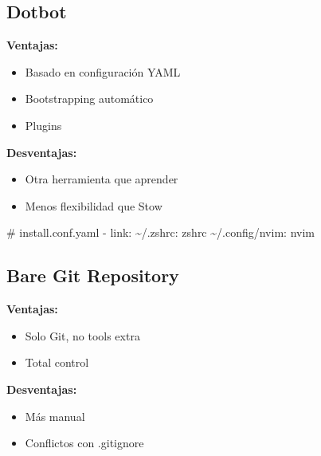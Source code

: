 \documentclass[
  doc,
  floatsintext,
  longtable,
  a4paper,
  nolmodern,
  notxfonts,
  notimes,
  12pt,
  colorlinks=true,linkcolor=blue,citecolor=blue,urlcolor=blue]{apa7}
\newenvironment{Shaded}{\begin{snugshade}}{\end{snugshade}}
\newcommand{\AttributeTok}[1]{\textcolor[rgb]{0.40,0.45,0.13}{#1}}
\newcommand{\BuiltInTok}[1]{\textcolor[rgb]{0.00,0.23,0.31}{#1}}
\newcommand{\CommentTok}[1]{\textcolor[rgb]{0.37,0.37,0.37}{#1}}
\newcommand{\ExtensionTok}[1]{\textcolor[rgb]{0.00,0.23,0.31}{#1}}
\newcommand{\FunctionTok}[1]{\textcolor[rgb]{0.28,0.35,0.67}{#1}}
\newcommand{\NormalTok}[1]{\textcolor[rgb]{0.00,0.23,0.31}{#1}}
\newcommand{\StringTok}[1]{\textcolor[rgb]{0.13,0.47,0.30}{#1}}
\newcommand{\VariableTok}[1]{\textcolor[rgb]{0.07,0.07,0.07}{#1}}
\providecommand{\tightlist}{%
  \setlength{\itemsep}{0pt}\setlength{\parskip}{0pt}}
\begin{document}
\subsection{Dotbot}\label{dotbot}

\textbf{Ventajas:}

\begin{itemize}
\tightlist
\item
  Basado en configuración YAML
\item
  Bootstrapping automático
\item
  Plugins
\end{itemize}

\textbf{Desventajas:}

\begin{itemize}
\tightlist
\item
  Otra herramienta que aprender
\item
  Menos flexibilidad que Stow
\end{itemize}

\begin{Shaded}
\begin{Highlighting}[]
\CommentTok{\# install.conf.yaml}
\ExtensionTok{{-}}\NormalTok{ link:}
    \ExtensionTok{\textasciitilde{}/.zshrc:}\NormalTok{ zshrc}
    \ExtensionTok{\textasciitilde{}/.config/nvim:}\NormalTok{ nvim}
\end{Highlighting}
\end{Shaded}

\subsection{Bare Git Repository}\label{bare-git-repository}

\textbf{Ventajas:}

\begin{itemize}
\tightlist
\item
  Solo Git, no tools extra
\item
  Total control
\end{itemize}

\textbf{Desventajas:}

\begin{itemize}
\tightlist
\item
  Más manual
\item
  Conflictos con .gitignore
\end{itemize}

\begin{Shaded}
\end{Shaded}
\end{document}
